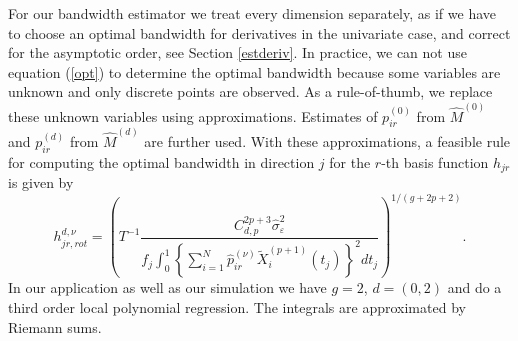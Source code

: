 For our bandwidth estimator we treat every dimension separately, as if we have to choose an optimal bandwidth for derivatives in the univariate case, and correct for the asymptotic order, see Section \ref{estderiv}.
In practice, we can not use equation (\ref{opt}) to determine the optimal bandwidth because some variables are unknown and only discrete points are observed.  As a rule-of-thumb, we replace these unknown variables using approximations. 
Estimates of $p^{(0)}_{ir}$ from $\hat{M}^{(0)}$ and $p^{(d)}_{ir}$ from $\hat{M}^{(d)}$ are further used. With these approximations, a feasible rule for computing the optimal bandwidth in direction $j$ for the $r$-th basis function $h_{jr}$ is given by
\begin{equation}\label{rulethumb}
h^{d,\nu}_{jr,rot} =\left(  T^{-1} \frac{C_{d,p}^{2p+3}\hat{\sigma}^2_{\varepsilon}  } { f_j \int_0^1 \left\{ \sum_{i=1}^N \hat{p}^{(\nu)}_{ir} \tilde{X}_i^{(p+1)} (t_j)    \right\}^2 d t_j } \right)^{1/(g+2p+2)}.
\end{equation}
In our application as well as our simulation we have $g=2$, $d=(0,2)$ and do a third order local polynomial regression. The integrals are approximated by Riemann sums. 

